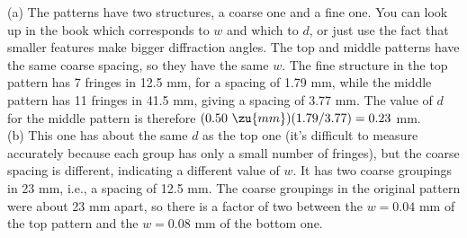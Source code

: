 (a) The patterns have two structures, a coarse one and a fine one.
You can look up in the book which corresponds to $w$ and which to $d$,
or just use the fact that smaller features make bigger diffraction
angles. The top and middle patterns have the same coarse spacing, so they
have the same $w$. The fine structure in the top pattern has
7 fringes in 12.5 mm, for a spacing of 1.79 mm, while the middle pattern
has 11 fringes in 41.5 mm, giving a spacing of 3.77 mm. The value of
$d$ for the middle pattern is therefore $(0.50\ \zu{mm})(1.79/3.77)=0.23$ mm.\\
%
(b) This one has about the same $d$ as the top one (it's difficult to measure
accurately because each group has only a small number of fringes),
but the coarse spacing
is different, indicating a different value of $w$. It has two coarse
groupings in 23 mm, i.e., a spacing of 12.5 mm. The coarse groupings
in the original pattern were about 23 mm apart, so there is a factor
of two between the $w=0.04$ mm of the top pattern and the $w=0.08$ mm
of the bottom one.
